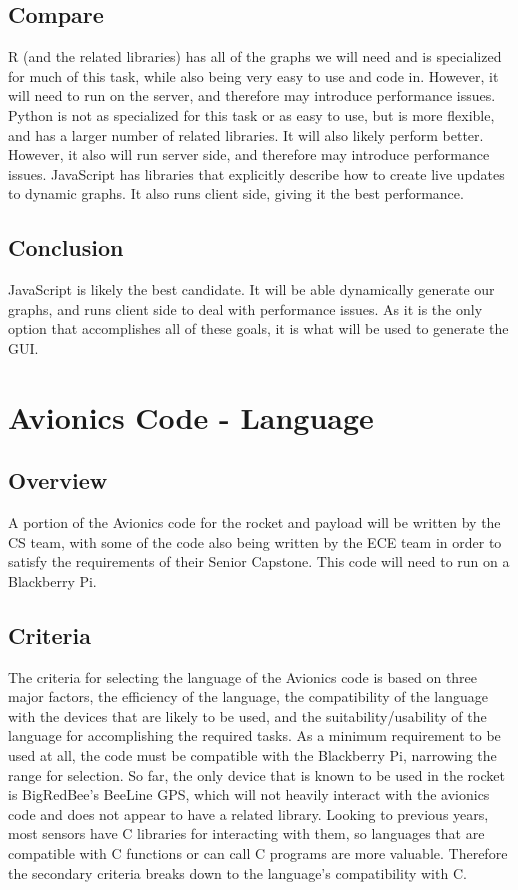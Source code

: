 \documentclass[onecolumn, draftclsnofoot,10pt, compsoc]{IEEEtran}
\begin{document}
\subsection{Compare}
R (and the related libraries) has all of the graphs we will need and is specialized for much of this task, while also being very easy to use and code in. However, it will need to run on the server, and therefore may introduce performance issues. Python is not as specialized for this task or as easy to use, but is more flexible, and has a larger number of related libraries. It will also likely perform better. However, it also will run server side, and therefore may introduce performance issues. JavaScript has libraries that explicitly describe how to create live updates to dynamic graphs. It also runs client side, giving it the best performance. 

\subsection{Conclusion}
JavaScript is likely the best candidate. It will be able dynamically generate our graphs, and runs client side to deal with performance issues. As it is the only option that accomplishes all of these goals, it is what will be used to generate the GUI.

\section{Avionics Code - Language}
\subsection{Overview}
A portion of the Avionics code for the rocket and payload will be written by the CS team, with some of the code also being written by the ECE team in order to satisfy the requirements of their Senior Capstone. This code will need to run on a Blackberry Pi.
\subsection{Criteria}
The criteria for selecting the language of the Avionics code is based on three major factors, the efficiency of the language, the compatibility of the language with the devices that are likely to be used, and the suitability/usability of the language for accomplishing the required tasks. As a minimum requirement to be used at all, the code must be compatible with the Blackberry Pi, narrowing the range for selection. So far, the only device that is known to be used in the rocket is BigRedBee's BeeLine GPS, which will not heavily interact with the avionics code and does not appear to have a related library. Looking to previous years, most sensors have C libraries for interacting with them, so languages that are compatible with C functions or can call C programs are more valuable. Therefore the secondary criteria breaks down to the language's compatibility with C.
\end{document}
